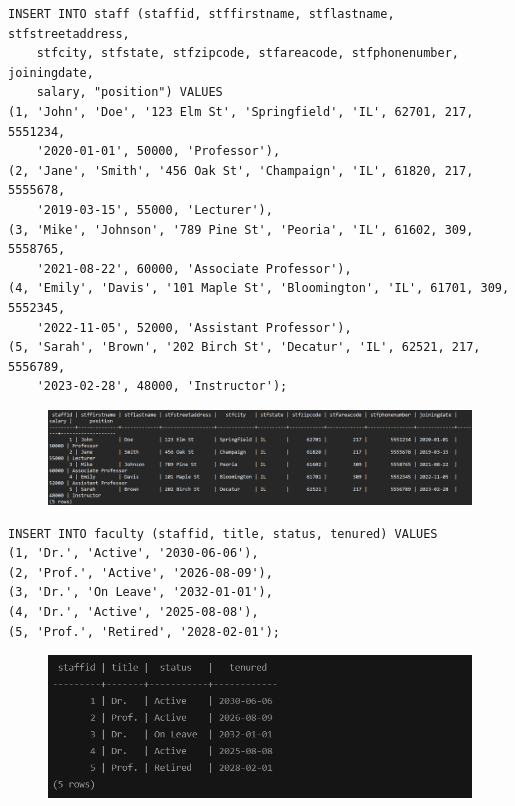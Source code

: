 \documentclass{article}
\begin{document}
\begin{Verbatim}[frame=single,framerule=1pt,fontfamily=courier,fontsize=\small]
INSERT INTO staff (staffid, stffirstname, stflastname, stfstreetaddress, 
    stfcity, stfstate, stfzipcode, stfareacode, stfphonenumber, joiningdate, 
    salary, "position") VALUES 
(1, 'John', 'Doe', '123 Elm St', 'Springfield', 'IL', 62701, 217, 5551234, 
    '2020-01-01', 50000, 'Professor'),
(2, 'Jane', 'Smith', '456 Oak St', 'Champaign', 'IL', 61820, 217, 5555678, 
    '2019-03-15', 55000, 'Lecturer'),
(3, 'Mike', 'Johnson', '789 Pine St', 'Peoria', 'IL', 61602, 309, 5558765, 
    '2021-08-22', 60000, 'Associate Professor'),
(4, 'Emily', 'Davis', '101 Maple St', 'Bloomington', 'IL', 61701, 309, 5552345, 
    '2022-11-05', 52000, 'Assistant Professor'),
(5, 'Sarah', 'Brown', '202 Birch St', 'Decatur', 'IL', 62521, 217, 5556789, 
    '2023-02-28', 48000, 'Instructor');
\end{Verbatim}
\begin{figure}[H]
    \centering
    \includegraphics[width=\textwidth]{select/staff.png}
\end{figure}

\begin{Verbatim}[frame=single,framerule=1pt,fontfamily=courier,fontsize=\small]
INSERT INTO faculty (staffid, title, status, tenured) VALUES 
(1, 'Dr.', 'Active', '2030-06-06'),
(2, 'Prof.', 'Active', '2026-08-09'),
(3, 'Dr.', 'On Leave', '2032-01-01'),
(4, 'Dr.', 'Active', '2025-08-08'),
(5, 'Prof.', 'Retired', '2028-02-01');
\end{Verbatim}
\begin{figure}[H]
    \centering
    \includegraphics[width=\textwidth]{select/faculty.png}
\end{figure}
\end{document}
